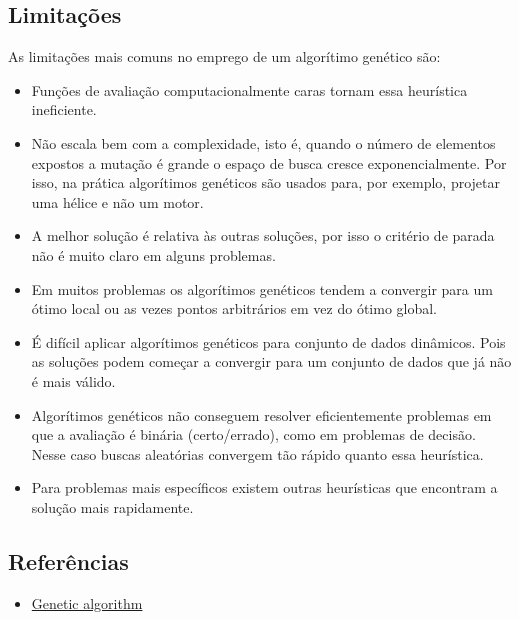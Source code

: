 \subsection{Limitações}

As limitações mais comuns no emprego de um algorítimo genético são:

\begin{itemize}
\itemsep1pt\parskip0pt
\item
  Funções de avaliação computacionalmente caras tornam essa heurística
  ineficiente.
\item
  Não escala bem com a complexidade, isto é, quando o número de
  elementos expostos a mutação é grande o espaço de busca cresce
  exponencialmente. Por isso, na prática algorítimos genéticos são
  usados para, por exemplo, projetar uma hélice e não um motor.
\item
  A melhor solução é relativa às outras soluções, por isso o critério de
  parada não é muito claro em alguns problemas.
\item
  Em muitos problemas os algorítimos genéticos tendem a convergir para
  um ótimo local ou as vezes pontos arbitrários em vez do ótimo global.
\item
  É difícil aplicar algorítimos genéticos para conjunto de dados
  dinâmicos. Pois as soluções podem começar a convergir para um conjunto
  de dados que já não é mais válido.
\item
  Algorítimos genéticos não conseguem resolver eficientemente problemas
  em que a avaliação é binária (certo/errado), como em problemas de
  decisão. Nesse caso buscas aleatórias convergem tão rápido quanto essa
  heurística.
\item
  Para problemas mais específicos existem outras heurísticas que
  encontram a solução mais rapidamente.
\end{itemize}

\subsection{Referências}

\begin{itemize}
\itemsep1pt\parskip0pt
\item
  \href{http://en.wikipedia.org/wiki/Genetic\_algorithm}{Genetic algorithm}
\end{itemize}
